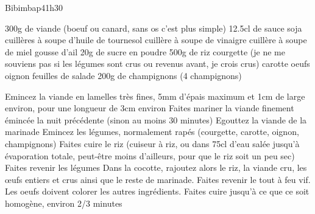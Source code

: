 {\renewcommand{\section}[1]{}

\section{Bibimbap}
\begin{recette}{Bibimbap}{4}{1h30}{}
\begin{ingredients}
\ingredient[Marinade]
\ingredient 300g de viande (boeuf ou canard, sans os c'est plus simple)
\ingredient 12.5cl de sauce soja
 cuillères à soupe d'huile de tournesol
 cuillère à soupe de vinaigre
 cuillère à soupe de miel
 gousse d'ail
\ingredient 20g de sucre en poudre
\ingredient[Plat]
\ingredient 500g de riz %
 courgette (je ne me souviens pas si les légumes sont crus ou revenus avant, je crois crus)
 carotte
 oeufs
 oignon
 feuilles de salade
\ingredient 200g de champignons (4 champignons)
\end{ingredients}

\begin{preparation}
\etape Emincez la viande en lamelles très fines, 5mm d'épais maximum et 1cm de large environ, pour une longueur de 3cm environ
\etape Faites mariner la viande finement émincée la nuit précédente (sinon au moins 30 minutes)
\etape Egouttez la viande de la marinade
\etape Emincez les légumes, normalement rapés (courgette, carotte, oignon, champignons)
\etape Faites cuire le riz (cuiseur à riz, ou dans 75cl d'eau salée jusqu'à évaporation totale, peut-être moins d'ailleurs, pour que le riz soit un peu sec)
\etape Faites revenir les légumes 
\etape Dans la cocotte, rajoutez alors le riz, la viande cru, les œufs entiers et crus ainsi que le reste de marinade. 
\etape Faites revenir le tout à feu vif. Les oeufs doivent colorer les autres ingrédients. Faites cuire jusqu'à ce que ce soit homogène, environ 2/3 minutes
\end{preparation}
\end{recette}

}
